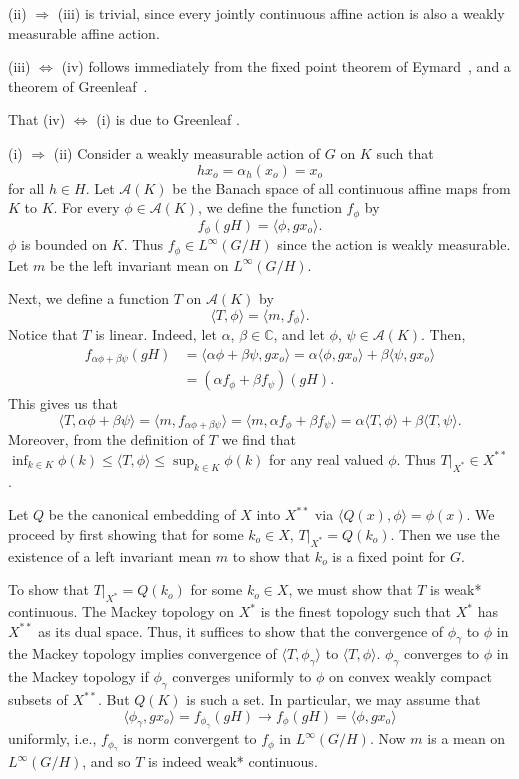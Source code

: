\proof
(ii) $\Rightarrow$ (iii) is trivial, since every jointly continuous affine action is
also a weakly measurable affine action.

(iii) $\Leftrightarrow$ (iv) follows immediately from the fixed point theorem of Eymard~\cite[p. 12]{eymard},
and a theorem of Greenleaf~\cite[Theorem 3.3]{gl:aa}.

That (iv) $\Leftrightarrow$ (i) is due to Greenleaf \cite[Theorem 3.3]{gl:aa}.

(i) $\Rightarrow$ (ii)  Consider a weakly measurable action of $G$ on $K$ such that
\[
hx_o = \alpha_h (x_o) = x_o
\]
 for all $h\in H$.
Let $\mathcal{A}(K)$ be the Banach space of all continuous affine maps from $K$ to $K$.
For every $\phi \in \mathcal{A}(K)$, we define the function $f_\phi$ by
\[
f_\phi (gH) = \langle\phi, g x_o\rangle.
\]
$\phi$ is bounded on $K$.  Thus $f_\phi \in L^\infty (G/H)$ since the action
is weakly measurable.
Let $m$ be the left invariant mean on $L^\infty (G/H)$.

Next, we define a function $T$ on $\mathcal{A}(K)$ by
\[
\langle T, \phi \rangle = \langle m, f_\phi \rangle.
\]
Notice that $T$ is linear.  Indeed, let $\alpha$, $\beta \in {\mathbb C}$, and
let $\phi$, $\psi \in \mathcal{A}(K)$. Then,
\begin{align*}
f_{\alpha\phi+\beta\psi}(gH) &= \langle \alpha\phi+\beta\psi,g x_o \rangle
= \alpha\langle\phi , g x_o \rangle + \beta\langle\psi, g x_o \rangle \\
&= (\alpha f_\phi + \beta f_\psi)(gH).
\end{align*}
This gives us that
\[
\langle T, \alpha\phi + \beta\psi \rangle = \langle m, f_{\alpha\phi + \beta\psi} \rangle
= \langle m, \alpha f_\phi + \beta f_\psi \rangle
= \alpha\langle T, \phi \rangle + \beta\langle T, \psi \rangle.
\]
Moreover, from the definition of $T$ we find that
$\inf_{k\in K} \phi(k) \leq \langle T, \phi \rangle \leq \sup_{k\in K} \phi(k)$ for any real
valued $\phi$.  Thus $T|_{X^*} \in X^{**}$.

Let $Q$ be the canonical embedding of $X$ into $X^{**}$ via $\langle Q(x),\phi\rangle = \phi(x)$.
We proceed by first showing that for some $k_o\in X$, $T|_{X^*} = Q(k_o)$.  Then we
use the existence of a left invariant mean $m$ to show that $k_o$ is a fixed point for $G$.

To show that $T|_{X^*} = Q(k_o)$ for some $k_o\in X$, we must show that $T$ is
weak* continuous.
The Mackey topology on $X^*$ is the finest topology such that $X^*$ has $X^{**}$ as its dual
space.  Thus, it suffices to show that the convergence of $\phi_\gamma$ to $\phi$ in the Mackey
topology implies convergence of $\langle T, \phi_\gamma \rangle$ to $\langle T, \phi \rangle$.
$\phi_\gamma$ converges to $\phi$ in the Mackey topology if $\phi_\gamma$ converges 
uniformly to $\phi$ on convex weakly compact subsets of $X^{**}$.  But $Q(K)$ is such a set.  In
particular, we may assume that
\[
\langle \phi_\gamma ,g x_o \rangle = f_{\phi_\gamma}(gH)
\rightarrow f_{\phi}(gH) = \langle \phi, g x_o \rangle
\]
uniformly, i.e., $f_{\phi_\gamma}$ is norm
convergent to $f_\phi$ in $L^\infty (G/H)$.  Now $m$ is a mean on
$L^\infty (G/H)$, and so $T$ is indeed weak* continuous.

